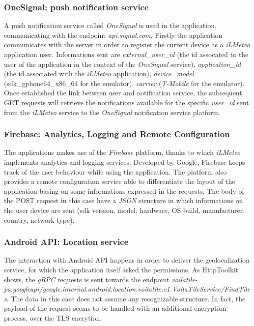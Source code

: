 			\subsubsection{OneSignal: push notification service}
				\par A push notification service called \textit{OneSignal} is used in the application, communicating with the endpoint \textit{api.signal.com}. Firstly the application communicates with the server in order to register the current device as a \textit{iLMeteo} application user. Informations sent are \textit{external\_user\_id} (the id assocated to the user of the application in the context of the \textit{OneSignal} service), \textit{application\_id} (the id associated with the \textit{iLMeteo} application), \textit{device\_model} (sdk\_gphone64\_x86\_64 for the emulator), \textit{carrier} (\textit{T-Mobile} for the emulator). Once established the link between user and notification service, the subsequent GET requests will retrieve the notifications available for the specific \textit{user\_id} sent from the \textit{iLMeteo} service to the \textit{OneSignal} notification service platform.
			
			\subsubsection{Firebase: Analytics, Logging and Remote Configuration}
				\par The applications makes use of the \textit{Firebase} platform, thanks to which \textit{iLMeteo} implements analytics and logging services. Developed by Google, Firebase keeps track of the user behaviour while using the application. The platform also provides a remote configuration service able to differentiate the layout of the application basing on some informations expressed in the requests. The body of the POST request in this case have a \textit{JSON} structure in which informations on the user device are sent (sdk version, model, hardware, OS build, manufacturer, country, network type).
			
			\subsubsection{Android API: Location service}
				\par The interaction with Android API happens in order to deliver the geolocalization service, for which the application itself asked the permissions. As HttpToolkit shows, the \textit{gRPC} requests is sent towards the endpoint \textit{voilatile-pa.googleapi/google.internal.android.location.voilatile.v1.VoilaTileService/FindTiles}. The data in this case does not assume any recognizable structure. In fact, the payload of the request seems to be handled with an additional encryption process, over the TLS encrytion. 
				
